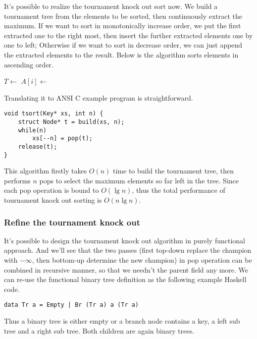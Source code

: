 \documentclass{article}
\begin{document}
It's possible to realize the tournament knock out sort now. We build a tournament tree from the elements
to be sorted, then continuously extract the maximum. If we want to sort in monotonically increase order,
we put the first extracted one to the right most, then insert the further extracted elements one by one
to left; Otherwise if we want to sort in decrease order, we can just append the extracted elements
to the result. Below is the algorithm sorts elements in ascending order.

\begin{algorithmic}
  \State $T \gets$ 
    \State $A[i] \gets$ 
  \EndFor
\EndProcedure
\end{algorithmic}

Translating it to ANSI C example program is straightforward.

\lstset{language=C}
\begin{lstlisting}
void tsort(Key* xs, int n) {
    struct Node* t = build(xs, n);
    while(n)
        xs[--n] = pop(t);
    release(t);
}
\end{lstlisting}

This algorithm firstly takes $O(n)$ time to build the tournament tree, then performs $n$ pops to select
the maximum elements so far left in the tree. Since each pop operation is bound to $O(\lg n)$, thus
the total performance of tournament knock out sorting is $O(n \lg n)$.

\subsubsection{Refine the tournament knock out}
It's possible to design the tournament knock out algorithm in purely functional approach. And we'll see
that the two passes (first top-down replace the champion with $-\infty$, then bottom-up determine the
new champion) in pop operation can be combined in recursive manner, so that we needn't the parent field
any more. We can re-use the functional binary tree definition as the following example Haskell code.

\lstset{language=Haskell}
\begin{lstlisting}
data Tr a = Empty | Br (Tr a) a (Tr a)
\end{lstlisting}

Thus a binary tree is either empty or a branch node contains a key, a left sub tree and a right sub tree.
Both children are again binary trees.
\end{document}
